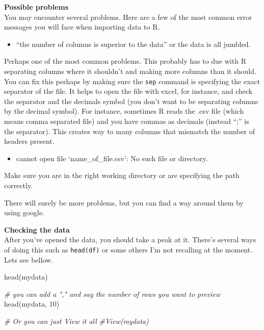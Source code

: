 \documentclass[
]{book}
\newenvironment{Shaded}{\begin{snugshade}}{\end{snugshade}}
\newcommand{\CommentTok}[1]{\textcolor[rgb]{0.56,0.35,0.01}{\textit{#1}}}
\newcommand{\DecValTok}[1]{\textcolor[rgb]{0.00,0.00,0.81}{#1}}
\newcommand{\FunctionTok}[1]{\textcolor[rgb]{0.00,0.00,0.00}{#1}}
\newcommand{\NormalTok}[1]{#1}
\providecommand{\tightlist}{%
  \setlength{\itemsep}{0pt}\setlength{\parskip}{0pt}}
\begin{document}
\textbf{Possible problems}\\
You may encounter several problems.
Here are a few of the most common error messages you will face when importing data to R.

\begin{itemize}
\tightlist
\item
  ``the number of columns is superior to the data'' or the data is all jumbled.
\end{itemize}

Perhaps one of the most common problems.
This probably has to due with R separating columns where it shouldn't and making more columns than it should.
You can fix this perhaps by making sure the \texttt{sep} command is specifying the exact separator of the file.
It helps to open the file with excel, for instance, and check the separator and the decimals symbol (you don't want to be separating columns by the decimal symbol).
For instance, sometimes R reads the .csv file (which means comma separated file) and you have commas as decimals (instead ``;'' is the separator).
This creates way to many columns that mismatch the number of headers present.

\begin{itemize}
\tightlist
\item
  cannot open file `name\_of\_file.csv': No such file or directory.
\end{itemize}

Make sure you are in the right working directory or are specifying the path correctly.

There will surely be more problems, but you can find a way around them by using google.

\textbf{Checking the data}\\
After you've opened the data, you should take a peak at it.
There's several ways of doing this such as \texttt{head(df)} or some others I'm not recalling at the moment.
Lets see bellow.

\begin{Shaded}
\begin{Highlighting}[]
\FunctionTok{head}\NormalTok{(mydata)}

\CommentTok{\# you can add a "," and say the number of rows you want to preview}
\FunctionTok{head}\NormalTok{(mydata, }\DecValTok{10}\NormalTok{) }

\CommentTok{\# Or you can just View it all}
\CommentTok{\#View(mydata)}
\end{Highlighting}
\end{Shaded}
\end{document}
